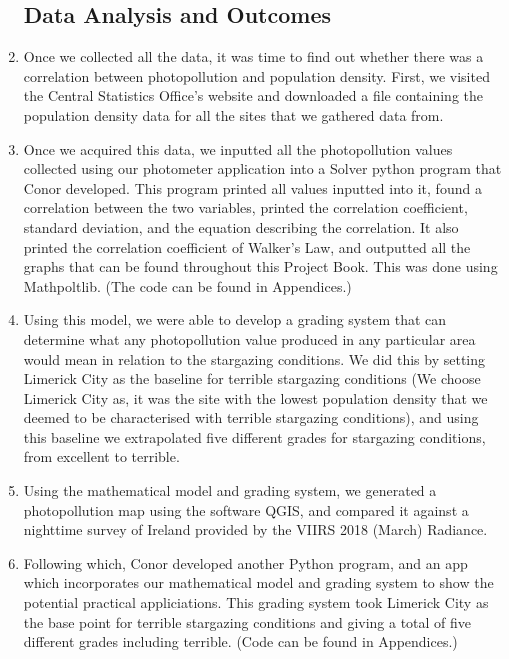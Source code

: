 \begin{enumerate}
\subsection{Data Analysis and Outcomes}
\item Once we collected all the data, it was time to find out whether there was a correlation between photopollution and population density. First, we visited the Central Statistics Office's website and downloaded a file containing the population density data for all the sites that we gathered data from.
\item Once we acquired this data, we inputted all the photopollution values collected using our photometer application into a Solver python program that Conor developed. This program printed all values inputted into it, found a correlation between the two variables, printed the correlation coefficient, standard deviation, and the equation describing the correlation. It also printed the correlation coefficient of Walker's Law, and outputted all the graphs that can be found throughout this Project Book. This was done using Mathpoltlib. (The code can be found in Appendices.)
\item Using this model, we were able to develop a grading system that can determine what any photopollution value produced in any particular area would mean in relation to the stargazing conditions. We did this by setting Limerick City as the baseline for terrible stargazing conditions (We choose Limerick City as, it was the site with the lowest population density that we deemed to be characterised with terrible stargazing conditions), and using this baseline we extrapolated five different grades for stargazing conditions, from excellent to terrible.  
\item Using the mathematical model and grading system, we generated a photopollution map using the software QGIS, and compared it against a nighttime survey of Ireland provided by the VIIRS 2018 (March) Radiance. 
\item Following which, Conor developed another Python program, and an app which incorporates our mathematical model and grading system to show the potential practical appliciations. This grading system took Limerick City as the base point for terrible stargazing conditions and giving a total of five different grades including terrible. (Code can be found in Appendices.)
\end{enumerate}




